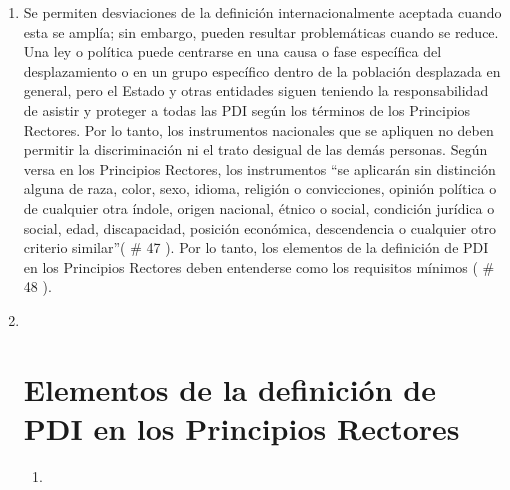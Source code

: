 \documentclass[
]{book}
\begin{document}
\begin{enumerate}
\item
  Se permiten desviaciones de la definición internacionalmente aceptada cuando esta se amplía; sin embargo, pueden resultar problemáticas cuando se reduce. Una ley o política puede centrarse en una causa o fase específica del desplazamiento o en un grupo específico dentro de la población desplazada en general, pero el Estado y otras entidades siguen teniendo la responsabilidad de asistir y proteger a todas las PDI según los términos de los Principios Rectores. Por lo tanto, los instrumentos nacionales que se apliquen no deben permitir la discriminación ni el trato desigual de las demás personas. Según versa en los Principios Rectores, los instrumentos ``se aplicarán sin distinción alguna de raza, color, sexo, idioma, religión o convicciones, opinión política o de cualquier otra índole, origen nacional, étnico o social, condición jurídica o social, edad, discapacidad, posición económica, descendencia o cualquier otro criterio similar''(
  \# 47
  ). Por lo tanto, los elementos de la definición de PDI en los Principios Rectores deben entenderse como los requisitos mínimos (
  \# 48
  ).
\item ~
  \hypertarget{elementos-de-la-definiciuxf3n-de-pdi-en-los-principios-rectores}{%
  \section{Elementos de la definición de PDI en los Principios Rectores}\label{elementos-de-la-definiciuxf3n-de-pdi-en-los-principios-rectores}}

  \begin{enumerate}
  \def\labelenumii{\arabic{enumii}.}
  \item ~
    \hypertarget{persona-forzada-u-obligada-a-huir-o-a-marcharse}{%
}
\end{enumerate}
\end{enumerate}
\end{document}
